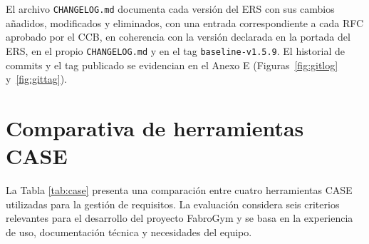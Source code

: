 \documentclass[11pt,a4paper]{article}
\begin{document}
El archivo \texttt{CHANGELOG.md} documenta cada versión del ERS con sus cambios añadidos, modificados y eliminados, con una entrada correspondiente a cada RFC aprobado por el CCB, en coherencia con la versión declarada en la portada del ERS, en el propio \texttt{CHANGELOG.md} y en el tag \texttt{baseline-v1.5.9}. El historial de commits y el tag publicado se evidencian en el Anexo E (Figuras~\ref{fig:gitlog} y~\ref{fig:gittag}).

\section{Comparativa de herramientas CASE}
La Tabla \ref{tab:case} presenta una comparación entre cuatro herramientas CASE utilizadas para la gestión de requisitos. La evaluación considera seis criterios relevantes para el desarrollo del proyecto FabroGym y se basa en la experiencia de uso, documentación técnica y necesidades del equipo.
\end{document}
